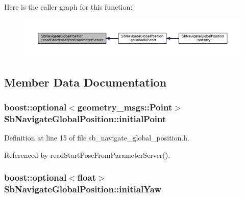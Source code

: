Here is the caller graph for this function\+:
\nopagebreak
\begin{figure}[H]
\begin{center}
\leavevmode
\includegraphics[width=350pt]{classSbNavigateGlobalPosition_a497b26df556f99524164619deb5b2352_icgraph}
\end{center}
\end{figure}




\subsection{Member Data Documentation}
\subsubsection[{\texorpdfstring{initial\+Point}{initialPoint}}]{\setlength{\rightskip}{0pt plus 5cm}boost\+::optional$<$geometry\+\_\+msgs\+::\+Point$>$ Sb\+Navigate\+Global\+Position\+::initial\+Point}\hypertarget{classSbNavigateGlobalPosition_a676844c9140653b6bc60e8efaa75df44}{}\label{classSbNavigateGlobalPosition_a676844c9140653b6bc60e8efaa75df44}


Definition at line 15 of file sb\+\_\+navigate\+\_\+global\+\_\+position.\+h.



Referenced by read\+Start\+Pose\+From\+Parameter\+Server().

\subsubsection[{\texorpdfstring{initial\+Yaw}{initialYaw}}]{\setlength{\rightskip}{0pt plus 5cm}boost\+::optional$<$float$>$ Sb\+Navigate\+Global\+Position\+::initial\+Yaw}\hypertarget{classSbNavigateGlobalPosition_a3c2a5e765e4a7f4bfe19c458ab469515}{}\label{classSbNavigateGlobalPosition_a3c2a5e765e4a7f4bfe19c458ab469515}


